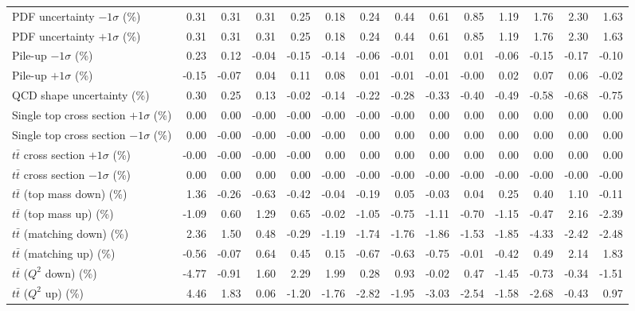\begin{table}[htbp]
{\begin{tabular}{lrrrrrrrrrrrrr}
PDF uncertainty $-1\sigma$ (\%) & 0.31 & 0.31 & 0.31 & 0.25 & 0.18 & 0.24 & 0.44 & 0.61 & 0.85 & 1.19 & 1.76 & 2.30 & 1.63 \\ 
PDF uncertainty $+1\sigma$ (\%) & 0.31 & 0.31 & 0.31 & 0.25 & 0.18 & 0.24 & 0.44 & 0.61 & 0.85 & 1.19 & 1.76 & 2.30 & 1.63 \\ 
Pile-up $-1\sigma$ (\%) & 0.23 & 0.12 & -0.04 & -0.15 & -0.14 & -0.06 & -0.01 & 0.01 & 0.01 & -0.06 & -0.15 & -0.17 & -0.10 \\ 
Pile-up $+1\sigma$ (\%) & -0.15 & -0.07 & 0.04 & 0.11 & 0.08 & 0.01 & -0.01 & -0.01 & -0.00 & 0.02 & 0.07 & 0.06 & -0.02 \\ 
QCD shape uncertainty (\%) & 0.30 & 0.25 & 0.13 & -0.02 & -0.14 & -0.22 & -0.28 & -0.33 & -0.40 & -0.49 & -0.58 & -0.68 & -0.75 \\ 
Single top cross section $+1\sigma$ (\%) & 0.00 & 0.00 & -0.00 & -0.00 & -0.00 & -0.00 & -0.00 & 0.00 & 0.00 & 0.00 & 0.00 & 0.00 & 0.00 \\ 
Single top cross section $-1\sigma$ (\%) & 0.00 & -0.00 & -0.00 & -0.00 & -0.00 & 0.00 & 0.00 & 0.00 & 0.00 & 0.00 & 0.00 & 0.00 & 0.00 \\ 
$t\bar{t}$ cross section $+1\sigma$ (\%) & -0.00 & -0.00 & -0.00 & -0.00 & 0.00 & 0.00 & 0.00 & 0.00 & 0.00 & 0.00 & 0.00 & 0.00 & 0.00 \\ 
$t\bar{t}$ cross section $-1\sigma$ (\%) & 0.00 & 0.00 & 0.00 & 0.00 & -0.00 & -0.00 & -0.00 & -0.00 & -0.00 & -0.00 & -0.00 & -0.00 & -0.00 \\ 
$t\bar{t}$ (top mass down) (\%) & 1.36 & -0.26 & -0.63 & -0.42 & -0.04 & -0.19 & 0.05 & -0.03 & 0.04 & 0.25 & 0.40 & 1.10 & -0.11 \\ 
$t\bar{t}$ (top mass up) (\%) & -1.09 & 0.60 & 1.29 & 0.65 & -0.02 & -1.05 & -0.75 & -1.11 & -0.70 & -1.15 & -0.47 & 2.16 & -2.39 \\ 
$t\bar{t}$ (matching down) (\%) & 2.36 & 1.50 & 0.48 & -0.29 & -1.19 & -1.74 & -1.76 & -1.86 & -1.53 & -1.85 & -4.33 & -2.42 & -2.48 \\ 
$t\bar{t}$ (matching up) (\%) & -0.56 & -0.07 & 0.64 & 0.45 & 0.15 & -0.67 & -0.63 & -0.75 & -0.01 & -0.42 & 0.49 & 2.14 & 1.83 \\ 
$t\bar{t}$ ($Q^{2}$ down) (\%) & -4.77 & -0.91 & 1.60 & 2.29 & 1.99 & 0.28 & 0.93 & -0.02 & 0.47 & -1.45 & -0.73 & -0.34 & -1.51 \\ 
$t\bar{t}$ ($Q^{2}$ up) (\%) & 4.46 & 1.83 & 0.06 & -1.20 & -1.76 & -2.82 & -1.95 & -3.03 & -2.54 & -1.58 & -2.68 & -0.43 & 0.97 \\ 

\end{tabular}}
\end{table}

